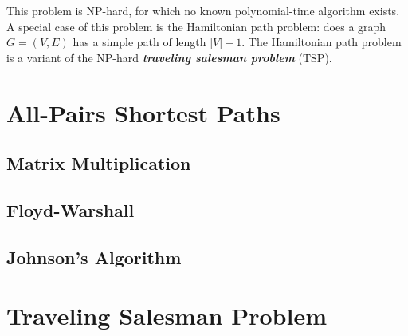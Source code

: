 This problem is NP-hard, for which no known polynomial-time algorithm exists. A special case of this problem is the Hamiltonian path problem: does a graph $G=(V,E)$ has a simple path of length $|V|-1$. The Hamiltonian path problem is a variant of the NP-hard \textit{\textbf{traveling salesman problem}} (TSP).

\section{All-Pairs Shortest Paths}

\subsection{Matrix Multiplication}

\subsection{Floyd-Warshall}

\subsection{Johnson's Algorithm}

\section{Traveling Salesman Problem}